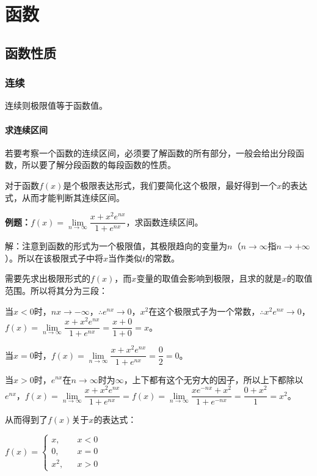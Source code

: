 \chapter{函数}
\section{函数性质}

\subsection{连续}

连续则极限值等于函数值。

\subsubsection{求连续区间}

若要考察一个函数的连续区间，必须要了解函数的所有部分，一般会给出分段函数，所以要了解分段函数的每段函数的性质。

对于函数$f(x)$是个极限表达形式，我们要简化这个极限，最好得到一个$x$的表达式，从而才能判断其连续区间。\medskip

\textbf{例题：}$f(x)=\lim\limits_{n\to\infty}\dfrac{x+x^2e^{nx}}{1+e^{nx}}$，求函数连续区间。\medskip

解：注意到函数的形式为一个极限值，其极限趋向的变量为$n$（$n\to\infty$指$n\to+\infty$）。所以在该极限式子中将$x$当作类似$t$的常数。

需要先求出极限形式的$f(x)$，而$x$变量的取值会影响到极限，且求的就是$x$的取值范围。所以将其分为三段：

当$x<0$时，$nx\to-\infty$，$\therefore e^{nx}\to 0$，$x^2$在这个极限式子为一个常数，$\therefore x^2e^{nx}\to 0$，$f(x)=\lim\limits_{n\to\infty}\dfrac{x+x^2e^{nx}}{1+e^{nx}}=\dfrac{x+0}{1+0}=x$。\medskip

当$x=0$时，$f(x)=\lim\limits_{n\to\infty}\dfrac{x+x^2e^{nx}}{1+e^{nx}}=\dfrac{0}{2}=0$。\medskip

当$x>0$时，$e^{nx}$在$n\to\infty$时为$\infty$，上下都有这个无穷大的因子，所以上下都除以$e^{nx}$，$f(x)=\lim\limits_{n\to\infty}\dfrac{x+x^2e^{nx}}{1+e^{nx}}=f(x)=\lim\limits_{n\to\infty}\dfrac{xe^{-nx}+x^2}{1+e^{-nx}}=\dfrac{0+x^2}{1}=x^2$。\medskip

从而得到了$f(x)$关于$x$的表达式：\medskip

$f(x)=\left\{\begin{array}{lcl}
        x,   &  & x<0 \\
        0,   &  & x=0 \\
        x^2, &  & x>0
    \end{array}
    \right.$\medskip

